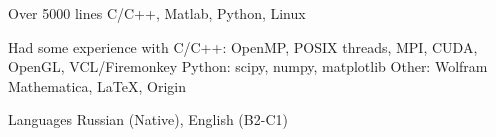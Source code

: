 

\begin{cvskills}

  \cvskill
    {Over 5000 lines} %
    {C/C++, Matlab, Python, Linux} %

  \cvskill
    {Had some experience with} %
    {\newline C/C++: OpenMP, POSIX threads, MPI, CUDA, OpenGL, VCL/Firemonkey \newline Python: scipy, numpy, matplotlib \newline Other: Wolfram Mathematica, \LaTeX, Origin \newline} %

  \cvskill
    {Languages} %
    {Russian (Native), English (B2-C1)} %

\end{cvskills}
